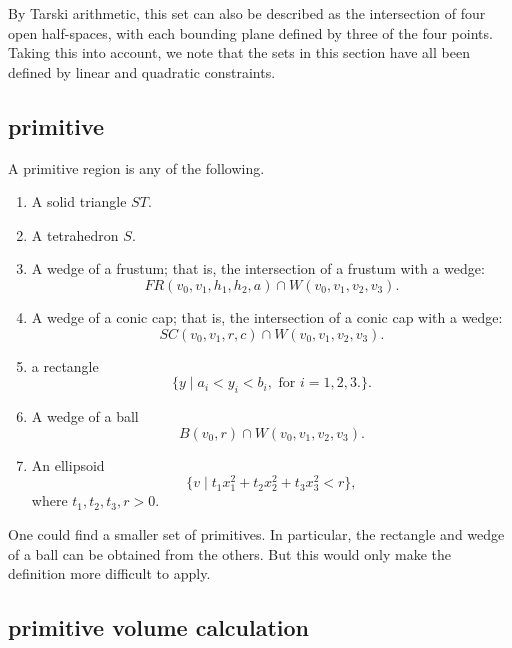 By Tarski arithmetic, %
this set can also be described
as the intersection of four open half-spaces, with each bounding
plane defined by three of the four points.
Taking this into account, we note that
the sets in this section have all been defined by linear and quadratic
constraints.

\subsection{primitive}

\begin{definition}[primitive]\label{def:primitive} 
A primitive region is any of the following.

\begin{enumerate}%
 \item A solid triangle $ST$.
 \item A tetrahedron $S$.
 \item A wedge of a frustum;
that is, the intersection of a frustum with
 a wedge:
    $$
     FR(v_0,v_1,h_1,h_2,a) \cap W(v_0,v_1,v_2,v_3).
    $$
\item A wedge of a conic cap; that is, the intersection of a conic cap
with
    a wedge:
    $$
    SC(v_0,v_1,r,c) \cap W(v_0,v_1,v_2,v_3).
    $$
\item a rectangle
    $$
    \{y \mid a_i < y_i < b_i,\text { for } i=1,2,3.\}.
    $$
\item A wedge of a ball
  $$
  B(v_0,r) \cap W(v_0,v_1,v_2,v_3).
  $$
\item An ellipsoid
   $$
   \{v \mid t_1 x_1^2 + t_2 x_2^2 + t_3 x_3^2 < r\},
   $$
where $t_1,t_2,t_3,r>0$.
\end{enumerate}
One could find a smaller set of primitives.  In particular, the
rectangle and wedge of a ball can be obtained from the others.  But
this would only make the definition more difficult to apply.

\end{definition}

\subsection{primitive volume calculation}\label{sec:primitive}


